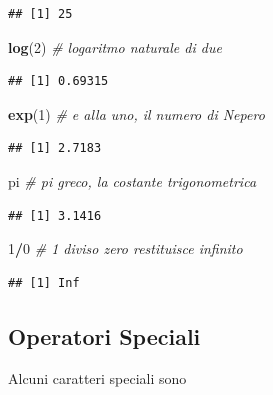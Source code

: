 \documentclass[
  11pt,
]{book}
\newenvironment{Shaded}{\begin{snugshade}}{\end{snugshade}}
\newcommand{\CommentTok}[1]{\textcolor[rgb]{0.56,0.35,0.01}{\textit{#1}}}
\newcommand{\DecValTok}[1]{\textcolor[rgb]{0.00,0.00,0.81}{#1}}
\newcommand{\FunctionTok}[1]{\textcolor[rgb]{0.13,0.29,0.53}{\textbf{#1}}}
\newcommand{\NormalTok}[1]{#1}
\newcommand{\SpecialCharTok}[1]{\textcolor[rgb]{0.81,0.36,0.00}{\textbf{#1}}}
\theoremstyle{mytheoremstyle}
\theoremstyle{mydefstyle}
\begin{document}
\begin{verbatim}
## [1] 25
\end{verbatim}

\begin{Shaded}
\begin{Highlighting}[]
\FunctionTok{log}\NormalTok{(}\DecValTok{2}\NormalTok{) }\CommentTok{\# logaritmo naturale di due}
\end{Highlighting}
\end{Shaded}

\begin{verbatim}
## [1] 0.69315
\end{verbatim}

\begin{Shaded}
\begin{Highlighting}[]
\FunctionTok{exp}\NormalTok{(}\DecValTok{1}\NormalTok{) }\CommentTok{\# e alla uno, il numero di Nepero}
\end{Highlighting}
\end{Shaded}

\begin{verbatim}
## [1] 2.7183
\end{verbatim}

\begin{Shaded}
\begin{Highlighting}[]
\NormalTok{pi }\CommentTok{\# pi greco, la costante trigonometrica}
\end{Highlighting}
\end{Shaded}

\begin{verbatim}
## [1] 3.1416
\end{verbatim}

\begin{Shaded}
\begin{Highlighting}[]
\DecValTok{1}\SpecialCharTok{/}\DecValTok{0} \CommentTok{\# 1 diviso zero restituisce  infinito}
\end{Highlighting}
\end{Shaded}

\begin{verbatim}
## [1] Inf
\end{verbatim}

\subsection{Operatori Speciali}\label{operatori-speciali}

Alcuni caratteri speciali sono
\end{document}
